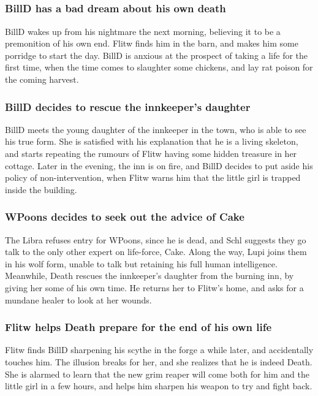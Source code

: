\subsection{}
\subsubsection{\Gls{BillD} has a bad dream about his own death}
\Gls{BillD} wakes up from his nightmare the next morning, believing it to be a premonition of his
own end. \Gls{Flitw} finds him in the barn, and makes him some porridge to start the day.
\Gls{BillD} is anxious at the prospect of taking a life for the first time, when the time comes to
slaughter some chickens, and lay rat poison for the coming harvest.

\subsubsection{\Gls{BillD} decides to rescue the innkeeper's daughter}
\Gls{BillD} meets the young daughter of the innkeeper in the town, who is able to see his true form.
She is satisfied with his explanation that he is a living skeleton, and starts repeating the
rumours of \Gls{Flitw} having some hidden treasure in her cottage. Later in the evening, the inn
is on fire, and \Gls{BillD} decides to put aside his policy of non-intervention, when \Gls{Flitw}
warns him that the little girl is trapped inside the building.

\subsubsection{\Gls{WPoons} decides to seek out the advice of \Gls{Cake}}
The \Gls{Libra} refuses entry for \Gls{WPoons}, since he is dead, and \Gls{Schl} suggests they go
talk to the only other expert on life-force, \Gls{Cake}. Along the way, \Gls{Lupi} joins them in his
wolf form, unable to talk but retaining his full human intelligence. Meanwhile, \Gls{Death} rescues
the innkeeper's daughter from the burning inn, by giving her some of his own time. He returns her to
\Gls{Flitw}'s home, and asks for a mundane healer to look at her wounds.

\subsubsection{\Gls{Flitw} helps \Gls{Death} prepare for the end of his own life}
\Gls{Flitw} finds \Gls{BillD} sharpening his scythe in the forge a while later, and accidentally
touches him. The illusion breaks for her, and she realizes that he is indeed \Gls{Death}. She is
alarmed to learn that the new grim reaper will come both for him and the little girl in a few hours,
and helps him sharpen his weapon to try and fight back.

